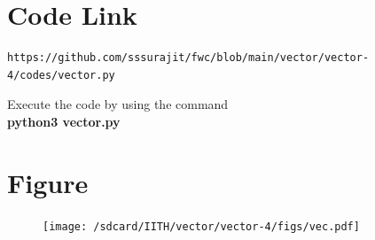 \documentclass[journal,12pt,twocolumn]{IEEEtran}
\begin{document}
\section{\textbf{Code Link}}
\begin{lstlisting}
https://github.com/sssurajit/fwc/blob/main/vector/vector-4/codes/vector.py
\end{lstlisting}
Execute the code by using the command\\
\textbf{python3 vector.py}
\section{\textbf{Figure}}
\begin{figure}[!h]
\centering
\texttt{[image: /sdcard/IITH/vector/vector-4/figs/vec.pdf]}
\caption{}
\label{fig:vec}
\end{figure}
\end{document}
